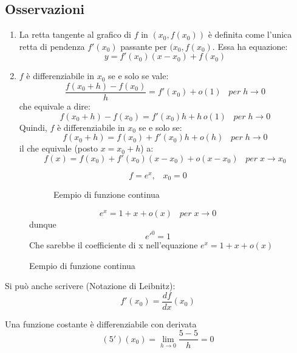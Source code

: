 \documentclass[a4paper]{article}
\theoremstyle{break}
\theoremstyle{break}
\theoremstyle{break}
\theoremstyle{break}
\begin{document}
\subsection{Osservazioni}
\begin{enumerate}
  \item La retta tangente al grafico di \( f \) in \( (x_0, f(x_0)) \) è definita
    come l'unica retta di pendenza \( f'(x_0) \) passante per \( (x_0, f(x_0) \).
    Essa ha equazione:
    \[
      y = f'(x_0)(x-x_0) + f(x_0)
    \]
  \item \( f \) è differenziabile in \( x_0 \) se e solo se vale:
    \[
      \frac{f(x_0+h)-f(x_0)}{h}=f'(x_0) + o(1)\;\;\; per\;h \to 0
    \]
    che equivale a dire:
    \[
      f(x_0+h)-f(x_0)=f'(x_0)h+h\,o(1)\;\;\; per\;h \to 0
    \]
    Quindi, \( f \) è differenziabile in \( x_0 \) se e solo se:
    \[
      f(x_0+h)=f(x_0)+f'(x_0)h + o(h) \;\;\; per\;h \to 0
    \]
    il che equivale (posto \( x=x_0+h \)) a:
    \[
      f(x)=f(x_0)+f'(x_0)(x-x_0)+o(x-x_0)\;\;\; per\;x \to x_0
    \]
\end{enumerate}
\begin{figure}[H]
  \begin{example}
    \[
      f=e^x,\;\;\; x_0=0
    \]
    \begin{figure}[H]
      \begin{center}
      \end{center}
      \caption{Eempio di funzione continua}
    \end{figure}
    \[
      e^x = 1 + x + o(x)\;\;\; per\;x \to 0
    \]
    dunque
    \[
      e'^0=1
    \]
    Che sarebbe il coefficiente di x nell'equazione \( e^x=1+x+o(x) \)
  \end{example}
\end{figure}
Si può anche scrivere (Notazione di Leibnitz):
\[
  f'(x_0) = \frac{df}{dx}(x_0)
\]
\begin{example}
  Una funzione costante è differenziabile con derivata
  \[
    (5')(x_0)= \lim_{h \to 0} \frac{5-5}{h} = 0
  \]
\end{example}
\end{document}
